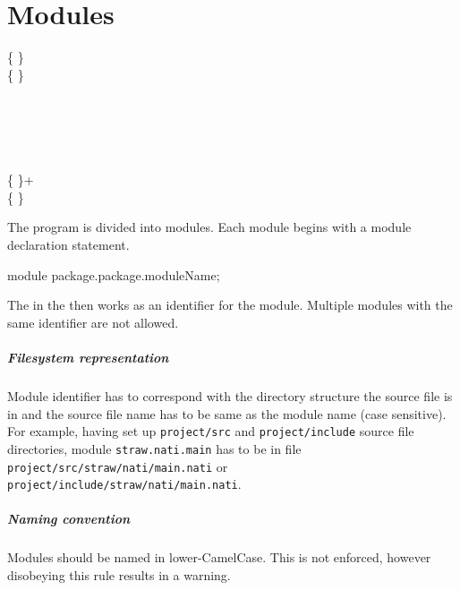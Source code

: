 \chapter{Modules}
\begin{grammar}
	   \kwd{;} \{  \} \\
	  \{   \} \\
	\\
	  \\
		\grAltLn {} \\
		\grAltLn {} \\
		\grAltLn {} \\
	 \{  \}+ \kwd{:} \\
	 \{  \} \kwd{\{}  \kwd{\}} \\
\end{grammar}

The program is divided into modules. Each module begins with a module declaration statement.
\begin{code}
module package.package.moduleName;
\end{code}

The  in the  then works as an identifier for the module. Multiple modules with the same identifier are not allowed.

\paragraph{Filesystem representation} Module identifier has to correspond with the directory structure the source file is in and the source file name has to be same as the module name (case sensitive). For example, having set up \verb|project/src| and \verb|project/include| source file directories, module \verb|straw.nati.main| has to be in file \verb|project/src/straw/nati/main.nati| or \verb|project/include/straw/nati/main.nati|.

\paragraph{Naming convention} Modules should be named in lower-CamelCase. This is not enforced, however disobeying this rule results in a warning.

